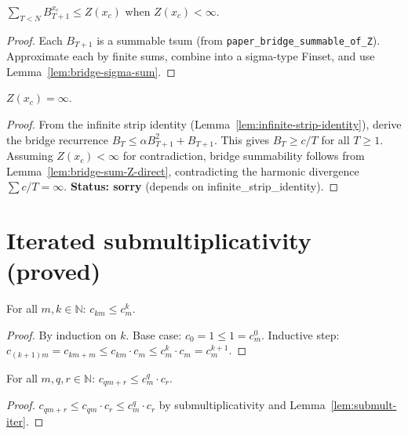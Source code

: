 \begin{lemma}
\begin{enumerate}
\begin{lemma}\label{lem:bridge-sum-Z-direct}
\leanok
  $\sum_{T < N} B^{x_c}_{T+1} \leq Z(x_c)$ when $Z(x_c) < \infty$.
\end{lemma}
\begin{proof}\leanok
  Each $B_{T+1}$ is a summable tsum (from \texttt{paper\_bridge\_summable\_of\_Z}).
  Approximate each by finite sums, combine into a sigma-type Finset,
  and use Lemma~\ref{lem:bridge-sigma-sum}.
\end{proof}

\begin{theorem}[$Z(x_c) = \infty$ (direct)]\label{thm:Z-xc-diverges-direct}
  $Z(x_c) = \infty$.
\end{theorem}
\begin{proof}
  From the infinite strip identity (Lemma~\ref{lem:infinite-strip-identity}),
  derive the bridge recurrence $B_T \leq \alpha B_{T+1}^2 + B_{T+1}$.
  This gives $B_T \geq c/T$ for all $T \geq 1$.
  Assuming $Z(x_c) < \infty$ for contradiction, bridge summability follows
  from Lemma~\ref{lem:bridge-sum-Z-direct}, contradicting the harmonic divergence
  $\sum c/T = \infty$. \textbf{Status: sorry} (depends on infinite\_strip\_identity).
\end{proof}

\section{Iterated submultiplicativity (proved)}\label{sec:submult-iter}

\begin{lemma}\label{lem:submult-iter}
\leanok
{}
  For all $m, k \in \mathbb{N}$: $c_{km} \leq c_m^k$.
\end{lemma}
\begin{proof}\leanok
  By induction on $k$. Base case: $c_0 = 1 \leq 1 = c_m^0$.
  Inductive step: $c_{(k+1)m} = c_{km + m} \leq c_{km} \cdot c_m
  \leq c_m^k \cdot c_m = c_m^{k+1}$.
\end{proof}

\begin{lemma}\label{lem:submult-remainder}
\leanok
{}
  For all $m, q, r \in \mathbb{N}$:
  $c_{qm+r} \leq c_m^q \cdot c_r$.
\end{lemma}
\begin{proof}\leanok
  $c_{qm+r} \leq c_{qm} \cdot c_r \leq c_m^q \cdot c_r$ by
  submultiplicativity and Lemma~\ref{lem:submult-iter}.
\end{proof}


\end{enumerate}
\end{lemma}
